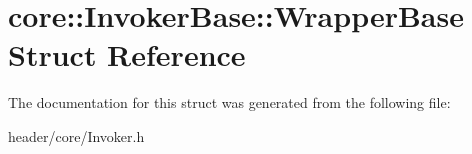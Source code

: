 \hypertarget{structcore_1_1_invoker_base_1_1_wrapper_base}{}\section{core\+:\+:Invoker\+Base\+:\+:Wrapper\+Base Struct Reference}
\label{structcore_1_1_invoker_base_1_1_wrapper_base}


The documentation for this struct was generated from the following file\+:\begin{DoxyCompactItemize}
\item 
header/core/Invoker.\+h\end{DoxyCompactItemize}
